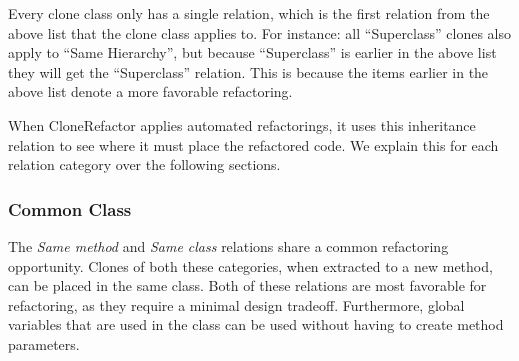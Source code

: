 \documentclass[runningheads]{llncs}
\begin{document}
Every clone class only has a single relation, which is the first relation from the above list that the clone class applies to. For instance: all ``Superclass'' clones also apply to ``Same Hierarchy'', but because ``Superclass'' is earlier in the above list they will get the ``Superclass'' relation. This is because the items earlier in the above list denote a more favorable refactoring.

When CloneRefactor applies automated refactorings, it uses this inheritance relation to see where it must place the refactored code. We explain this for each relation category over the following sections.




\subsubsection{Common Class}
The \textit{Same method} and \textit{Same class} relations share a common refactoring opportunity. Clones of both these categories, when extracted to a new method, can be placed in the same class. Both of these relations are most favorable for refactoring, as they require a minimal design tradeoff. Furthermore, global variables that are used in the class can be used without having to create method parameters.


\end{document}
